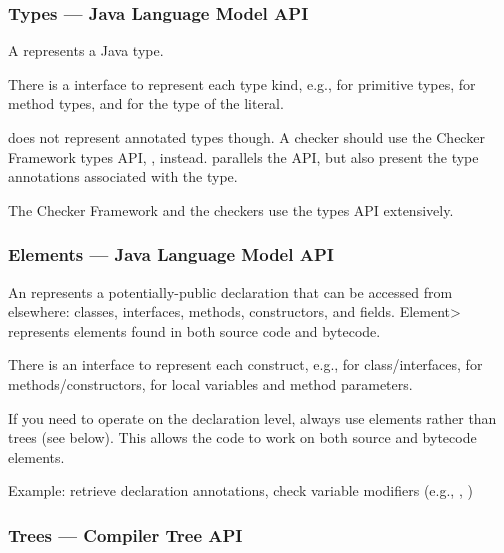 \subsubsection{Types --- Java Language Model API\label{javac-types}}

A  represents a Java type.

\begin{sloppypar}
There is a  interface to represent each type kind,
e.g.,  for primitive types, 
for method types, and  for the type of the  literal.
\end{sloppypar}

 does not represent annotated types though.  A checker
should use the Checker Framework types API,
, instead.  
parallels the  API, but also present the type annotations
associated with the type.

The Checker Framework and the checkers use the types API extensively.


\subsubsection{Elements --- Java Language Model API\label{javac-elements}}

An  represents a potentially-public
declaration that can be accessed from elsewhere:  classes, interfaces, methods, constructors, and
fields.  \<Element> represents elements found in both source
code and bytecode.

There is an  interface to represent each construct, e.g.,
 for class/interfaces,  for
methods/constructors,  for local variables and
method parameters.

If you need to operate on the declaration level, always use elements rather
than trees
(see below).  This allows the code to work on
both source and bytecode elements.

Example: retrieve declaration annotations, check variable
modifiers (e.g., , )


\subsubsection{Trees --- Compiler Tree API\label{javac-trees}}

